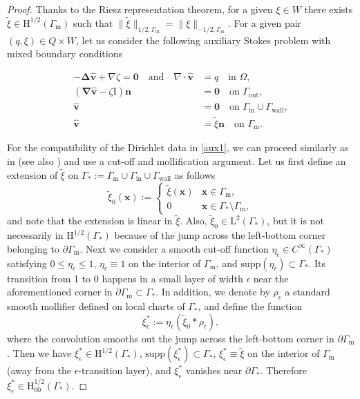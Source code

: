 \documentclass[onefignum,onetabnum,reqno,a4paper,final]{siamart250211}
\newcommand\bv{\boldsymbol{v}}
\newcommand\bx{\boldsymbol{x}}
\newcommand\bn{\boldsymbol{n}}
\newcommand\0{\mathbf{0}}
\renewcommand\H{\mathrm{H}}
\newcommand\bI{\boldsymbol{\mathrm{I}}}
\newcommand\bzero{\boldsymbol{0}}
\newcommand\Gm{\Gamma_{\mathrm{m}}}
\newcommand\Gi{\Gamma_{\mathrm{in}}}
\newcommand\Go{\Gamma_{\mathrm{out}}}
\newcommand\Gw{\Gamma_{\mathrm{wall}}}
\numberwithin{figure}{section}
\numberwithin{table}{section}
\begin{document}
\begin{proof}
Thanks to the Riesz representation theorem, for a given $\xi \in W$ there exists $\tilde{\xi} \in \H^{1/2}(\Gm)$ such that $\|\tilde{\xi}\|_{1/2,\Gm}=\|\xi\|_{-1/2,\Gm}$. 
	For a given pair $(q,\xi)\in Q\times W$, let us consider the following auxiliary  Stokes problem with mixed boundary conditions 
	\begin{linenomath}\begin{align}
			-\boldsymbol{\Delta} \hat{\bv} + \nabla\zeta  = \boldsymbol{0} \quad \text{and}\quad \nabla\cdot \hat{\bv} &= q \quad  \text{in } \Omega,\nonumber\\
			(\boldsymbol{\nabla}\hat{\bv} - \zeta\bI)\bn & = \boldsymbol{0} \quad \text{on } \Go,\label{aux1}\\
   \hat{\bv} & = \bzero  \quad \text{on } \Gi \cup \Gw,\nonumber \\
			\hat{\bv}& = \tilde{\xi}\bn \quad \text{on } \Gm.\nonumber
		\end{align}    
	\end{linenomath}
For the compatibility of the Dirichlet data in \eqref{aux1}, we can proceed similarly as in \cite{lions1969quelques,grisvard2011elliptic} (see also \cite{le1993steady}) and use a cut-off and mollification argument. 
Let us first define an extension of $\tilde{\xi}$ on $\Gamma_* := \Gm \cup \Gi \cup \Gw$ as follows
\[ \tilde{\xi}_0(\bx) := \begin{cases}
    \tilde{\xi}(\bx) & \bx \in \Gm,\\
    0 & \bx \in \Gamma_*\setminus \Gm,
\end{cases}\]
and note that the extension is linear in $\tilde{\xi}$. Also, $\tilde{\xi}_0 \in \mathrm{L}^2(\Gamma_*)$, but it is not necessarily in $\mathrm{H}^{1/2}(\Gamma_*)$ because of the jump across the left-bottom corner belonging to $\partial\Gm$. Next we consider a smooth cut-off function $\eta_{\epsilon} \in C^\infty(\Gamma_*)$ satisfying $0 \leq \eta_{\epsilon} \leq 1$, $\eta_\epsilon \equiv 1$ on the interior of $\Gm$, and $\text{supp}(\eta_{\epsilon})\subset \Gamma_*$. Its transition from 1 to 0 happens in a small layer of width $\epsilon$ near the aforementioned corner in $\partial\Gm \subset \Gamma_*$. In addition, we denote by $\rho_{\epsilon}$ a standard smooth mollifier
 defined on local charts of $\Gamma_*$, and define the function 
 \[ \xi_{\epsilon}^*:= \eta_{\epsilon}(\tilde{\xi}_0 * \rho_{\epsilon}),\]
 where the convolution smooths out the jump across the left-bottom corner in $\partial\Gm$. Then we have $\xi_{\epsilon}^* \in \mathrm{H}^{1/2}(\Gamma_*)$, $\text{supp}(\xi_{\epsilon}^*)\subset \Gamma_*$, $\xi_{\epsilon}^* \equiv \tilde{\xi}$ on the interior of $\Gm$ (away from the $\epsilon$-transition layer), and $\xi_{\epsilon}^*$ vanishes near $\partial\Gamma_*$. Therefore $\xi_{\epsilon}^* \in \mathrm{H}^{1/2}_{00}(\Gamma_*)$.
 

\end{proof}
\end{document}
